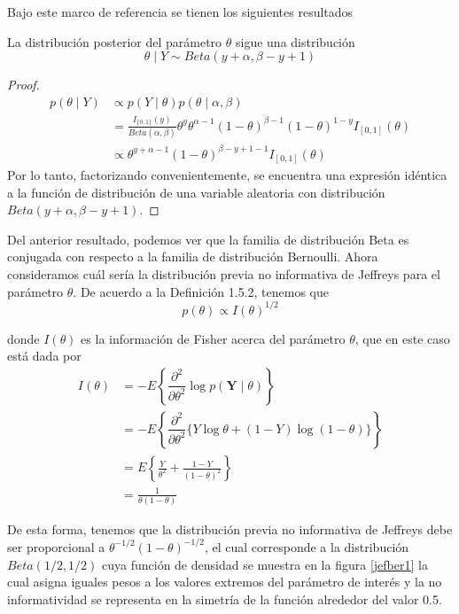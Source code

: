     
    Bajo este marco de referencia se tienen los siguientes resultados
    \begin{Res}
    La distribuci\'on posterior del par\'ametro $\theta$ sigue una distribuci\'on
    \begin{equation*}
    \theta \mid Y \sim Beta(y+\alpha,\beta-y+1)
    \end{equation*}
    \end{Res}
    
    \begin{proof}
    \begin{align*}
    p(\theta \mid Y)&\propto p(Y \mid \theta)p(\theta \mid \alpha,\beta)\\
    &=\frac{I_{\{0,1\}}(y)}{Beta(\alpha,\beta)}\theta^y\theta^{\alpha-1}(1-\theta)^{\beta-1}(1-\theta)^{1-y}I_{[0,1]}(\theta)\\
    &\propto \theta^{y+\alpha-1}(1-\theta)^{\beta-y+1-1}I_{[0,1]}(\theta)
    \end{align*}
    Por lo tanto, factorizando convenientemente, se encuentra una expresi\'on id\'entica a la funci\'on de distribuci\'on de una variable aleatoria con distribuci\'on $Beta(y+\alpha,\beta-y+1)$.
    \end{proof}
    
    
    Del anterior resultado, podemos ver que la familia de distribuci\'on Beta es conjugada con respecto a la familia de distribuci\'on Bernoulli. Ahora consideramos cu\'al ser\'ia la distribuci\'on previa no informativa de Jeffreys para el par\'ametro $\theta$. De acuerdo a la Definici\'on 1.5.2, tenemos que
    \begin{equation*}
    p(\theta)\propto I(\theta) ^{1/2}
    \end{equation*}
    
    donde $I(\theta)$ es la informaci\'on de Fisher acerca del par\'ametro $\theta$, que en este caso est\'a dada por
    \begin{align*}
    I(\theta)&=-E\left\{\dfrac{\partial^2}{\partial\theta^2}\log{p(\mathbf{Y}\mid\theta)}\right\}\\
    &=-E\left\{\dfrac{\partial^2}{\partial\theta^2}\{Y\log\theta+(1-Y)\log(1-\theta)\}\right\}\\
    &=E\left\{\frac{Y}{\theta^2}+\frac{1-Y}{(1-\theta)^2}\right\}\\
    &=\frac{1}{\theta(1-\theta)}
    \end{align*}
    
    De esta forma, tenemos que la distribuci\'on previa no informativa de Jeffreys debe ser proporcional a $\theta^{-1/2}(1-\theta)^{-1/2}$, el cual corresponde a la distribuci\'on $Beta(1/2,1/2)$ cuya funci\'on de densidad se muestra en la figura \ref{jefber1} la cual asigna iguales pesos a los valores extremos del par\'ametro de inter\'es y la no informatividad se representa en la simetr\'ia de la funci\'on alrededor del valor 0.5.
    
